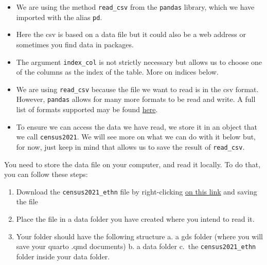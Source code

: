 \documentclass[
  letterpaper,
  DIV=11,
  numbers=noendperiod]{scrreprt}
\begin{document}
\begin{itemize}
\item
  We are using the method \texttt{read\_csv} from the \texttt{pandas}
  library, which we have imported with the alias \texttt{pd}.
\item
  Here the csv is based on a data file but it could also be a web
  address or sometimes you find data in packages.
\item
  The argument \texttt{index\_col} is not strictly necessary but allows
  us to choose one of the columns as the index of the table. More on
  indices below.
\item
  We are using \texttt{read\_csv} because the file we want to read is in
  the csv format. However, \texttt{pandas} allows for many more formats
  to be read and write. A full list of formats supported may be found
  \href{https://www.datacamp.com/tutorial/r-data-import-tutorial}{here}.
\item
  To ensure we can access the data we have read, we store it in an
  object that we call \texttt{census2021}. We will see more on what we
  can do with it below but, for now, just keep in mind that allows us to
  save the result of \texttt{read\_csv}.
\end{itemize}

\begin{tcolorbox}[enhanced jigsaw, breakable, toptitle=1mm, titlerule=0mm, opacityback=0, colback=white, coltitle=black, leftrule=.75mm, bottomtitle=1mm, colframe=quarto-callout-important-color-frame, colbacktitle=quarto-callout-important-color!10!white, toprule=.15mm, bottomrule=.15mm, arc=.35mm, rightrule=.15mm, opacitybacktitle=0.6, title=\textcolor{quarto-callout-important-color}{\faExclamation}\hspace{0.5em}{Important}, left=2mm]

You need to store the data file on your computer, and read it locally.
To do that, you can follow these steps:

\begin{enumerate}
\def\labelenumi{\arabic{enumi}.}
\item
  Download the \texttt{census2021\_ethn} file by right-clicking
  \href{https://github.com/pietrostefani/gds/tree/main/data}{on this
  link} and saving the file
\item
  Place the file in a data folder you have created where you intend to
  read it.
\item
  Your folder should have the following structure a. a gds folder (where
  you will save your quarto .qmd documents) b. a data folder c.~the
  \texttt{census2021\_ethn} folder inside your data folder.
\end{enumerate}

\end{tcolorbox}
\end{document}
